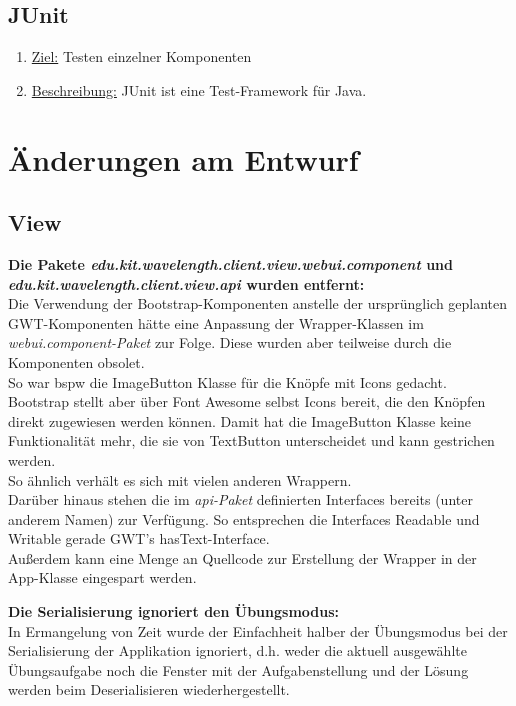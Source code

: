 \documentclass[parskip=full,11pt,twoside]{scrartcl}
\begin{document}
\subsection{JUnit}
\begin{enumerate}
\item \underline{Ziel:} Testen einzelner Komponenten
\item \underline{Beschreibung:} JUnit ist eine Test-Framework für Java.
\end{enumerate}

\section{Änderungen am Entwurf}

\subsection{View}
\textbf{Die Pakete \emph{edu.kit.wavelength.client.view.webui.component} und \emph{edu.kit.wavelength.client.view.api} wurden entfernt:} \\
Die Verwendung der Bootstrap-Komponenten anstelle der ursprünglich geplanten GWT-Komponenten hätte eine Anpassung der Wrapper-Klassen im \emph{webui.component-Paket} zur Folge.
Diese wurden aber teilweise durch die Komponenten obsolet. \\
So war bspw die ImageButton Klasse für die Knöpfe mit Icons gedacht.
Bootstrap stellt aber über Font Awesome selbst Icons bereit, die den Knöpfen direkt zugewiesen werden können.
Damit hat die ImageButton Klasse keine Funktionalität mehr, die sie von TextButton unterscheidet und kann gestrichen werden. \\
So ähnlich verhält es sich mit vielen anderen Wrappern.\\
Darüber hinaus stehen die im \emph{api-Paket} definierten Interfaces bereits (unter anderem Namen) zur Verfügung.
So entsprechen die Interfaces Readable und Writable gerade GWT's hasText-Interface.\\	
Außerdem kann eine Menge an Quellcode zur Erstellung der Wrapper in der App-Klasse eingespart werden.

\textbf{Die Serialisierung ignoriert den Übungsmodus:} \\
In Ermangelung von Zeit wurde der Einfachheit halber der Übungsmodus bei der Serialisierung der Applikation ignoriert, d.h. 
 weder die aktuell ausgewählte Übungsaufgabe noch die Fenster mit der Aufgabenstellung und der Lösung werden beim 
 Deserialisieren wiederhergestellt.
\end{document}
